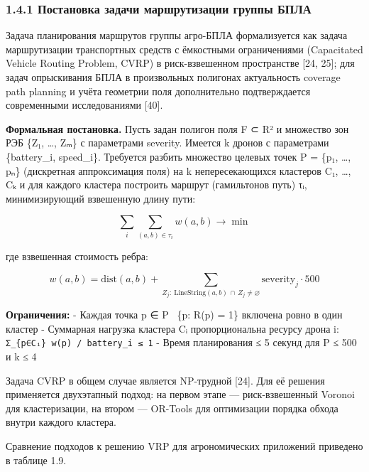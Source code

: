 \hypertarget{ux43fux43eux441ux442ux430ux43dux43eux432ux43aux430-ux437ux430ux434ux430ux447ux438-ux43cux430ux440ux448ux440ux443ux442ux438ux437ux430ux446ux438ux438-ux433ux440ux443ux43fux43fux44b-ux431ux43fux43bux430}{%
\subsubsection{1.4.1 Постановка задачи маршрутизации группы БПЛА}\label{ux43fux43eux441ux442ux430ux43dux43eux432ux43aux430-ux437ux430ux434ux430ux447ux438-ux43cux430ux440ux448ux440ux443ux442ux438ux437ux430ux446ux438ux438-ux433ux440ux443ux43fux43fux44b-ux431ux43fux43bux430}}

Задача планирования маршрутов группы агро-БПЛА формализуется как задача маршрутизации транспортных средств с ёмкостными ограничениями (Capacitated Vehicle Routing Problem, CVRP) в риск-взвешенном пространстве {[}24, 25{]}; для задач опрыскивания БПЛА в произвольных полигонах актуальность coverage path planning и учёта геометрии поля дополнительно подтверждается современными исследованиями {[}40{]}.

\textbf{Формальная постановка.} Пусть задан полигон поля F ⊂ R² и множество зон РЭБ \{Z₁, \ldots, Zₘ\} с параметрами severity. Имеется k дронов с параметрами \{battery\_i, speed\_i\}. Требуется разбить множество целевых точек P = \{p₁, \ldots, pₙ\} (дискретная аппроксимация поля) на k непересекающихся кластеров C₁, \ldots, Cₖ и для каждого кластера построить маршрут (гамильтонов путь) τᵢ, минимизирующий взвешенную длину пути:

\[\sum_{i} \sum_{(a,b) \in \tau_i} w(a,b) \to \min\]

где взвешенная стоимость ребра:

\[w(a,b) = \mathrm{dist}(a,b) + \sum_{Z_j:\ \mathrm{LineString}(a,b)\, \cap\, Z_j \ne \varnothing} \mathrm{severity}_j \cdot 500\]

\textbf{Ограничения:} - Каждая точка p ∈ P ~\{p: R(p) = 1\} включена ровно в один кластер - Суммарная нагрузка кластера Cᵢ пропорциональна ресурсу дрона i: \texttt{Σ\_\{p∈Cᵢ\}\ w(p)\ /\ battery\_i\ ≤\ 1} - Время планирования ≤ 5 секунд для \textbar P\textbar{} ≤ 500 и k ≤ 4

Задача CVRP в общем случае является NP-трудной {[}24{]}. Для её решения применяется двухэтапный подход: на первом этапе --- риск-взвешенный Voronoi для кластеризации, на втором --- OR-Tools для оптимизации порядка обхода внутри каждого кластера.

Сравнение подходов к решению VRP для агрономических приложений приведено в таблице 1.9.

